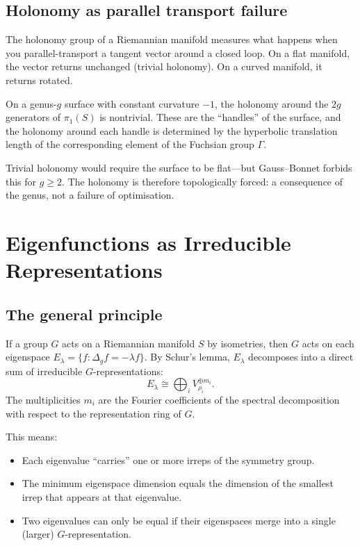 \documentclass[11pt,a4paper]{article}
\begin{document}
\subsection{Holonomy as parallel transport failure}

The holonomy group of a Riemannian manifold measures what happens when you
parallel-transport a tangent vector around a closed loop. On a flat manifold,
the vector returns unchanged (trivial holonomy). On a curved manifold, it
returns rotated.

On a genus-$g$ surface with constant curvature $-1$, the holonomy around the
$2g$ generators of $\pi_1(S)$ is nontrivial. These are the ``handles'' of
the surface, and the holonomy around each handle is determined by the
hyperbolic translation length of the corresponding element of the Fuchsian
group $\Gamma$.

Trivial holonomy would require the surface to be flat---but Gauss--Bonnet
forbids this for $g \geq 2$. The holonomy is therefore topologically forced:
a consequence of the genus, not a failure of optimisation.

\section{Eigenfunctions as Irreducible Representations}

\subsection{The general principle}

If a group $G$ acts on a Riemannian manifold $S$ by isometries, then $G$ acts on
each eigenspace $E_\lambda = \{f : \Delta_g f = -\lambda f\}$. By Schur's lemma,
$E_\lambda$ decomposes into a direct sum of irreducible $G$-representations:
\[
  E_\lambda \cong \bigoplus_i V_{\rho_i}^{\oplus m_i}.
\]
The multiplicities $m_i$ are the Fourier coefficients of the spectral
decomposition with respect to the representation ring of $G$.

This means:
\begin{itemize}[leftmargin=*]
  \item Each eigenvalue ``carries'' one or more irreps of the symmetry group.
  \item The minimum eigenspace dimension equals the dimension of the smallest
    irrep that appears at that eigenvalue.
  \item Two eigenvalues can only be equal if their eigenspaces merge into a
    single (larger) $G$-representation.
\end{itemize}
\end{document}
